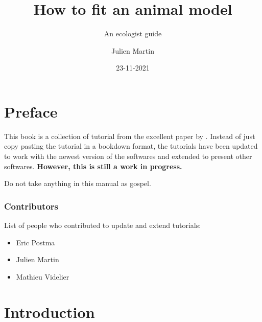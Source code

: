 \documentclass[
  12pt,
]{book}
\title{How to fit an animal model}
\subtitle{An ecologist guide}
\author{Julien Martin}
\date{23-11-2021}
\makeatletter
\providecommand{\tightlist}{%
  \setlength{\itemsep}{0pt}\setlength{\parskip}{0pt}}
\newenvironment{kframe}{%
\medskip{}
\setlength{\fboxsep}{.8em}
\def\at@end@of@kframe{}%
\ifinner\ifhmode%
 \def\at@end@of@kframe{\end{minipage}}%
 \begin{minipage}{\columnwidth}%
\fi\fi%
\def\FrameCommand##1{\hskip\@totalleftmargin \hskip-\fboxsep
\colorbox{incolor}{##1}\hskip-\fboxsep
    \hskip-\linewidth \hskip-\@totalleftmargin \hskip\columnwidth}%
\MakeFramed {\advance\hsize-\width
  \@totalleftmargin\z@ \linewidth\hsize
  \@setminipage}}%
{\par\unskip\endMakeFramed%
\at@end@of@kframe}
\newenvironment{rmdblock}[1]
 {
 \begin{itemize}
 \renewcommand{\labelitemi}{
   \raisebox{-.7\height}[0pt][0pt]{
     {\setkeys{Gin}{width=3em,keepaspectratio}\texttt{[image: images/\#1]}}
   }
 }
 \begin{kframe}
 \setlength{\fboxsep}{1em}
 \item
 }
 {
 \end{kframe}
 \end{itemize}
 }
\newenvironment{rmdwarning}
  {\begin{rmdblock}{warning}}
  {\end{rmdblock}}
\makeatother
\begin{document}
\maketitle



{
\setcounter{tocdepth}{1}
\tableofcontents
}
\hypertarget{preface}{%
\chapter*{Preface}\label{preface}}

This book is a collection of tutorial from the excellent paper by \citep{wilson2010}.
Instead of just copy pasting the tutorial in a bookdown format, the tutorials have been updated to work with the newest version of the softwares and extended to present other softwares.
\textbf{However, this is still a work in progress.}

\begin{rmdwarning}
Do not take anything in this manual as gospel.
\end{rmdwarning}

\hypertarget{contributors}{%
\subsection*{Contributors}\label{contributors}}

List of people who contributed to update and extend tutorials:

\begin{itemize}
\tightlist
\item
  Eric Postma
\item
  Julien Martin
\item
  Mathieu Videlier
\end{itemize}

\hypertarget{intro}{%
\chapter{Introduction}\label{intro}}
\end{document}
